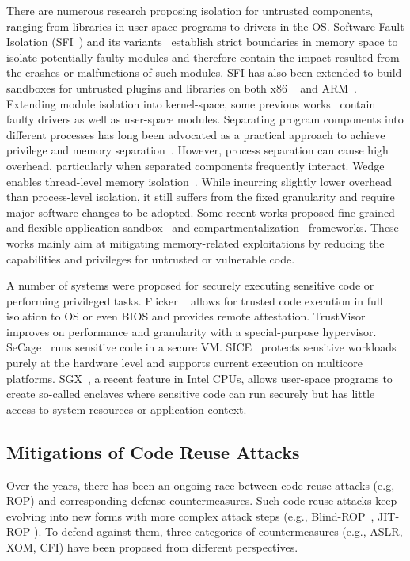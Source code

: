 There are numerous research proposing isolation for untrusted components, ranging from libraries in user-space programs to drivers in the OS. Software Fault Isolation (SFI~\cite{sfi}) and its variants~\cite{fastsfi,erlingsson2006xfi} establish strict boundaries in memory space to isolate potentially faulty modules and therefore contain the impact resulted from the crashes or malfunctions of such modules. SFI has also been extended to build sandboxes for untrusted plugins and libraries on both x86 ~\cite{vx32,yee2009native} and ARM~\cite{naclarm,zhou2014armlock}. Extending module isolation into kernel-space, some previous works~\cite{erlingsson2006xfi,strackx2012fides} contain faulty drivers as well as user-space modules. 
Separating program components into different processes has long been advocated as a practical approach to achieve privilege and memory separation~\cite{kilpatrick2003privman,provos2003preventing,brumley2004privtrans,wireframe}. However, process separation can cause high overhead, particularly when separated components frequently interact. Wedge enables thread-level memory isolation~\cite{wedge}. While incurring slightly lower overhead than process-level isolation, it still suffers from the fixed granularity and require major software changes to be adopted.
Some recent works proposed fine-grained and flexible application sandbox~\cite{watson2010capsicum,belay2012dune} and compartmentalization~\cite{watson2015cheri} frameworks. These works mainly aim at mitigating memory-related exploitations by reducing the capabilities and privileges for untrusted or vulnerable code. 

A number of systems were proposed for securely executing sensitive code or performing privileged tasks. Flicker ~\cite{mccune2008flicker} allows for trusted code execution in full isolation to OS or even BIOS and provides remote attestation. TrustVisor~\cite{mccune2010trustvisor} improves on performance and granularity with a special-purpose hypervisor. SeCage~\cite{secage} runs sensitive code in a secure VM. SICE~\cite{azab2011sice} protects sensitive workloads purely at the hardware level and supports current execution on multicore platforms. SGX~\cite{sgx}, a recent feature in Intel CPUs, allows user-space programs to create so-called enclaves where sensitive code can run securely but has little access to system resources or application context.

\subsection{Mitigations of Code Reuse Attacks}
Over the years, there has been an ongoing race between code reuse attacks (e.g, ROP) and corresponding defense countermeasures. Such code reuse attacks keep evolving into new forms with more complex attack steps (e.g., Blind-ROP~\cite{brop}, JIT-ROP \cite{jitrop}). To defend against them, three categories of countermeasures (e.g., ASLR, XOM, CFI) have been proposed from different perspectives.


